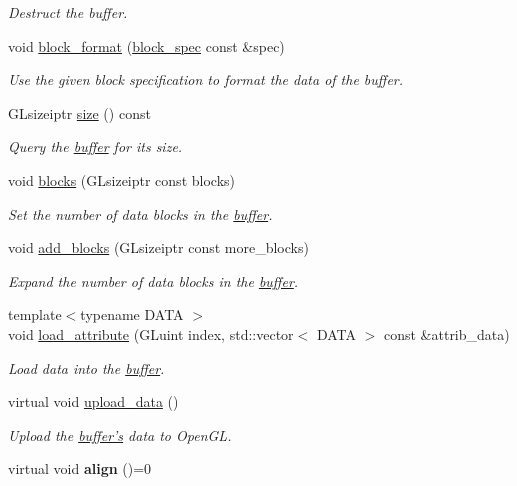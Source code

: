 \begin{DoxyCompactItemize}
\begin{DoxyCompactList}\small\item\em Destruct the buffer. \end{DoxyCompactList}\item 
void \hyperlink{classgfx_1_1buffer_ad9b89548222f37163c44f402e8577110}{block\-\_\-format} (\hyperlink{classgfx_1_1block__spec}{block\-\_\-spec} const \&spec)
\begin{DoxyCompactList}\small\item\em Use the given block specification to format the data of the buffer. \end{DoxyCompactList}\item 
G\-Lsizeiptr \hyperlink{classgfx_1_1buffer_a21c20dcd317940802016dc93f1e38f19}{size} () const 
\begin{DoxyCompactList}\small\item\em Query the \hyperlink{classgfx_1_1buffer}{buffer} for its size. \end{DoxyCompactList}\item 
void \hyperlink{classgfx_1_1buffer_a9c4e3ba0b7794299c80cd400bd6625f8}{blocks} (G\-Lsizeiptr const blocks)
\begin{DoxyCompactList}\small\item\em Set the number of data blocks in the \hyperlink{classgfx_1_1buffer}{buffer}. \end{DoxyCompactList}\item 
void \hyperlink{classgfx_1_1buffer_a08cffdcb5184e6ff8fec0df1ad817163}{add\-\_\-blocks} (G\-Lsizeiptr const more\-\_\-blocks)
\begin{DoxyCompactList}\small\item\em Expand the number of data blocks in the \hyperlink{classgfx_1_1buffer}{buffer}. \end{DoxyCompactList}\item 
{\footnotesize template$<$typename D\-A\-T\-A $>$ }\\void \hyperlink{classgfx_1_1buffer_a44af69c977b694cce9b5014f6440efc9}{load\-\_\-attribute} (G\-Luint index, std\-::vector$<$ D\-A\-T\-A $>$ const \&attrib\-\_\-data)
\begin{DoxyCompactList}\small\item\em Load data into the \hyperlink{classgfx_1_1buffer}{buffer}. \end{DoxyCompactList}\item 
virtual void \hyperlink{classgfx_1_1buffer_a7019485ae327de1d5d5525185196ff43}{upload\-\_\-data} ()
\begin{DoxyCompactList}\small\item\em Upload the \hyperlink{classgfx_1_1buffer}{buffer's} data to Open\-G\-L. \end{DoxyCompactList}\item 
\hypertarget{classgfx_1_1buffer_a8395dfeccf42d150dd698211d361fcec}{virtual void {\bfseries align} ()=0}\label{classgfx_1_1buffer_a8395dfeccf42d150dd698211d361fcec}

\end{DoxyCompactItemize}
